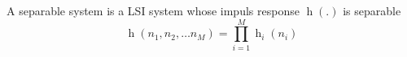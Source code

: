 A separable system is a LSI system whose impuls response $\operatorname{h}(.)$  is separable
$$\operatorname{h}(n_{1}, n_{2}, \dots n_{M}) = \prod\limits_{i = 1}^{M} \operatorname{h}_{i}(n_{i})$$
